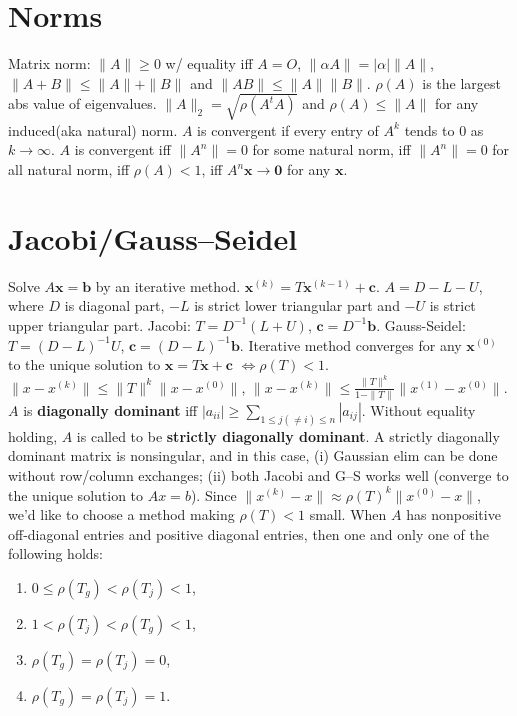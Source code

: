 \documentclass[b4paper,10pt]{memoir}
\begin{document}
\begin{multicols*}{3}
    \setcounter{chapter}{7}
    \setcounter{section}{0}
    \section{Norms}
    \s Matrix norm: $\|A\|\ge 0$ w/ equality iff $A=O$, $\|\alpha A\| = |\alpha|\|A\|$, $\|A+B\|\le \|A\|+\|B\|$ and $\|AB\| \le \|A\|\|B\|$. \nl
    \s $\rho(A)$ is the largest abs value of eigenvalues. \nl
    \s $\|A\|_2 = \sqrt{\rho(A^tA)}$ and $\rho(A) \le \|A\|$ for any induced(aka natural) norm. \nl
    \s $A$ is convergent if every entry of $A^k$ tends to 0 as $k\to\infty$.\nl
    \s $A$ is convergent iff $\|A^n\|=0$ for some natural norm, iff $\|A^n\|=0$ for all natural norm, iff $\rho(A)<1$, iff $A^n\mathbf x \to \mathbf 0$ for any $\mathbf x$.

    \setcounter{section}{2}
    \section{Jacobi/Gauss--Seidel}
    \s Solve $A\mathbf x = \mathbf b$ by an iterative method.\nl
    \s $\mathbf x^{(k)} = T\mathbf x^{(k-1)}+\mathbf c$.\nl
    \s $A = D - L - U$, where $D$ is diagonal part, $-L$ is strict lower triangular part and $-U$ is strict upper triangular part. \nl
    \s Jacobi: $T = D^{-1}(L+U)$, $\mathbf c = D^{-1}\mathbf b$. \nl
    \s Gauss-Seidel: \nl $T = (D-L)^{-1}U$, $\mathbf c = (D-L)^{-1}\mathbf b$. \nl
    \s Iterative method converges for any $\mathbf x^{(0)}$ to the unique solution to $\mathbf x = T\mathbf x + \mathbf c$ \nl $\iff\rho(T) <1.$ \nl
    \s $\|x-x^{(k)}\| \le \|T\|^k \|x-x^{(0)}\|$, \nl
    \s $\|x-x^{(k)}\| \le \frac{\|T\|^k}{1-\|T\|} \|x^{(1)}-x^{(0)}\|$. \nl
    \s $A$ is \textbf{diagonally dominant} iff \nl $|a_{ii}| \ge \sum_{1\le j(\ne i)\le n} |a_{ij}|$. Without equality holding, $A$ is called to be \textbf{strictly diagonally dominant}.
    \s A strictly diagonally dominant matrix is nonsingular, and in this case, (i) Gaussian elim can be done without row/column exchanges; (ii) both Jacobi and G--S works well (converge to the unique solution to $Ax = b$). \nl
    \s Since $\|x^{(k)}-x\| \approx \rho(T)^k \|x^{(0)}-x\|$, we'd like to choose a method making $\rho(T)<1$ small. \nl
    \s When $A$ has nonpositive off-diagonal entries and positive diagonal entries, then one and only one of the following holds:
    \begin{enumerate}[topsep=0pt,itemsep=0pt,parsep=0pt,partopsep=0pt]
        \item $0\le \rho(T_g) < \rho(T_j )<1$,
        \item $1<\rho(T_j) < \rho(T_g)<1$,
        \item $\rho(T_g)=\rho(T_j )=0$,
        \item $\rho(T_g)=\rho(T_j )=1$.
    \end{enumerate}


\end{multicols*}
\end{document}
